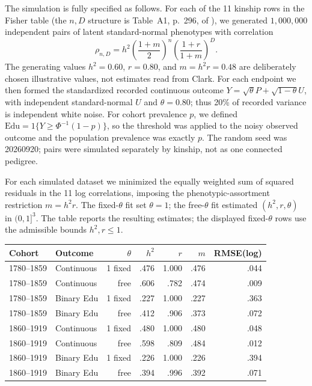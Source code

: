The simulation is fully specified as follows. For each of the 11 kinship rows
in the Fisher table (the $n,D$ structure is Table~A1, p.~296, of
\citet{Clark2026}), we generated $1{,}000{,}000$ independent pairs of latent
standard-normal phenotypes with correlation
\[
 \rho_{n,D}=h^2\left(\frac{1+m}{2}\right)^n
 \left(\frac{1+r}{1+m}\right)^D.
\]
The generating values $h^2=0.60$, $r=0.80$, and $m=h^2r=0.48$ are deliberately
chosen illustrative values, not estimates read from Clark. For each endpoint
we then formed the standardized recorded continuous outcome
$Y=\sqrt{\theta}P+\sqrt{1-\theta}U$, with independent standard-normal $U$ and
$\theta=0.80$; thus 20\% of recorded variance is independent white noise.
For cohort prevalence $p$, we defined
$\mathrm{Edu}=1\{Y\geq\Phi^{-1}(1-p)\}$, so the threshold was applied to the
noisy observed outcome and the population prevalence was exactly $p$. The
random seed was 20260920; pairs were simulated separately by kinship, not as
one connected pedigree.

For each simulated dataset we minimized the equally weighted sum of squared
residuals in the 11 log correlations, imposing the phenotypic-assortment
restriction $m=h^2r$. The fixed-$\theta$ fit set $\theta=1$; the free-$\theta$
fit estimated $(h^2,r,\theta)$ in $(0,1]^3$. The table reports the resulting
estimates; the displayed fixed-$\theta$ rows use the admissible bounds
$h^2,r\leq1$.

\begin{center}
\small
\begin{tabular}{llrrrrr}
\hline
Cohort & Outcome & $\theta$ & $h^2$ & $r$ & $m$ & RMSE(log)\\
\hline
1780--1859 & Continuous & 1 fixed & .476 & 1.000 & .476 & .044\\
1780--1859 & Continuous & free & .606 & .782 & .474 & .009\\
1780--1859 & Binary Edu & 1 fixed & .227 & 1.000 & .227 & .363\\
1780--1859 & Binary Edu & free & .412 & .906 & .373 & .072\\
1860--1919 & Continuous & 1 fixed & .480 & 1.000 & .480 & .048\\
1860--1919 & Continuous & free & .598 & .809 & .484 & .012\\
1860--1919 & Binary Edu & 1 fixed & .226 & 1.000 & .226 & .394\\
1860--1919 & Binary Edu & free & .394 & .996 & .392 & .071\\
\hline
\end{tabular}
\end{center}

